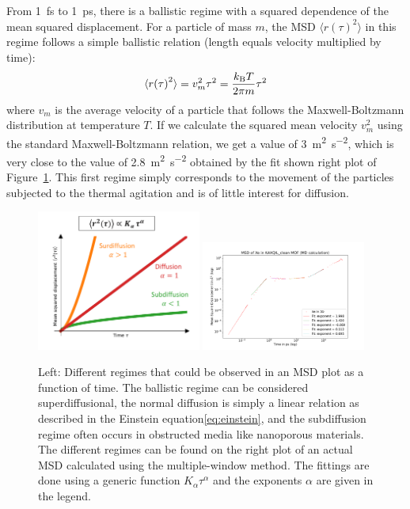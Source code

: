 \documentclass[main]{subfiles}
\begin{document}
From \SI{1}{\fs} to \SI{1}{\ps}, there is a ballistic regime with a squared dependence of the mean squared displacement. For a particle of mass $m$, the MSD $\langle {r(\tau)}^2 \rangle$ in this regime follows a simple ballistic relation (length equals velocity multiplied by time):
\begin{equation}
  \langle {r(\tau)}^2 \rangle = v_m^2 \tau^2 = \frac{k_{\text{B}}T}{2\pi m}\tau^2
\end{equation}
where $v_m$ is the average velocity of a particle that follows the Maxwell-Boltzmann distribution at temperature $T$. If we calculate the squared mean velocity $v_m^2$ using the standard Maxwell-Boltzmann relation, we get a value of \SI{3}{\square\m\per\square\second}, which is very close to the value of \SI{2.8}{\square\m\per\square\second} obtained by the fit shown right plot of Figure~\ref{fgr:MSD_init}. This first regime simply corresponds to the movement of the particles subjected to the thermal agitation and is of little interest for diffusion. 

\begin{figure}[ht]
  \centering
    \includegraphics[width=0.48\textwidth]{figures/5-diffusion/MSD_anomalous_diffusion.pdf}
    \includegraphics[width=0.48\textwidth]{figures/5-diffusion/MSD_Xe_KAXQIL_clean.pdf}
    \caption{Left: Different regimes that could be observed in an MSD plot as a function of time. The ballistic regime can be considered superdiffusional, the normal diffusion is simply a linear relation as described in the Einstein equation\ref{eq:einstein}, and the subdiffusion regime often occurs in obstructed media like nanoporous materials. The different regimes can be found on the right plot of an actual MSD calculated using the multiple-window method. The fittings are done using a generic function $K_\alpha\tau^\alpha$ and the exponents $\alpha$ are given in the legend. }\label{fgr:MSD_init}
\end{figure}
\end{document}
